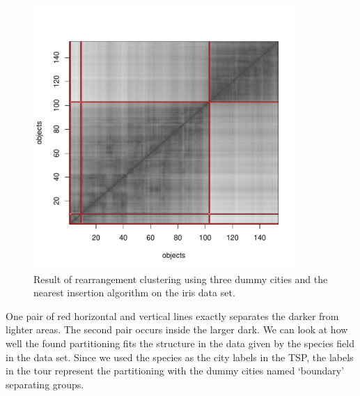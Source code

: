 \documentclass[10pt,a4paper,fleqn]{article}
\begin{document}
\begin{figure}
\centering
\includegraphics[width=10cm, trim=0 20 0 0]{TSP-clustering}
\caption{Result of rearrangement clustering using three dummy cities and the 
nearest insertion algorithm on the iris data set.}
\label{fig:clustering}
\end{figure}


One pair of red horizontal and vertical lines exactly separates the darker from
lighter areas. The second pair occurs inside the larger dark.  We can look at
how well the found partitioning fits the structure in the data given by the
species field in the data set. Since we used the species as the city labels in
the TSP, the labels in the tour represent the partitioning with the dummy
cities named `boundary' separating groups.
\end{document}
